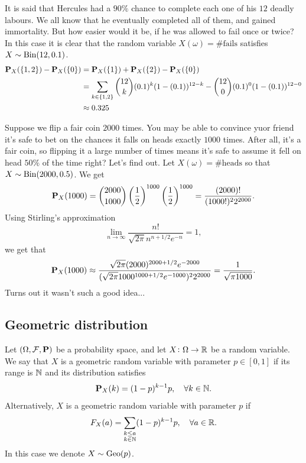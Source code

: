 \documentclass[11pt,a4paper]{article}
\begin{document}
\begin{example}
It is said that Hercules had a $90\%$ chance to complete each
one of his $12$ deadly labours. We all know that he eventually completed
all of them, and gained immortality. But how easier would it be, if he
was allowed to fail once or twice?
In this case it is clear that the random variable $X(\omega) = \#\text{fails}$
satisfies $X \sim \operatorname{Bin}(12,0.1)$.
\begin{align*}
  \mathbf{P}_X(\{1,2\}) - \mathbf{P}_X(\{0\}) &=
  \mathbf{P}_X(\{1\}) + \mathbf{P}_X(\{2\}) - \mathbf{P}_X(\{0\}) \\ &=
  \sum_{k \in \{1,2\}}
  \binom{12}{k} (0.1)^k (1 - (0.1))^{12-k} -
  \binom{12}{0} (0.1)^0 (1 - (0.1))^{12-0} \\ &\approx
  0.325
\end{align*}
\end{example}
\begin{example}
  Suppose we flip a fair coin $2000$ times. You may be able to convince
  yuor friend it's safe to bet on the chances it falls on heads exactly
  $1000$ times. After all, it's a fair coin, so flipping it a large number
  of times means it's safe to assume it fell on head $50\%$ of the time
  right? Let's find out.
  Let $X(\omega) = \#\text{heads}$ so that
  $X \sim \operatorname{Bin}(2000,0.5)$.
  We get
  \[
    \mathbf{P}_{X}(1000) =
    \binom{2000}{1000} \left(\frac{1}{2}\right)^{1000}
    \left(\frac{1}{2}\right)^{1000} =
    \frac{(2000)!}{(1000!)^{2}2^{2000}}.
  \]
  Using Stirling's approximation
  \[
    \lim_{n\rightarrow\infty}
    {\frac{n!}{\sqrt{2\pi}n^{n+1/2}e^{-n}}}=1,
  \]
  we get that
  \[
    \mathbf{P}_{X}(1000) \approx
    \frac{\sqrt{2\pi}(2000)^{2000+1/2}e^{-2000}}
        {({\sqrt{2\pi}}1000^{1000+1/2}e^{-1000})^{2}2^{2000}} =
    {\frac{1}{\sqrt{\pi 1000}}}.
  \]
  Turns out it wasn't such a good idea...
\end{example}

\subsection{Geometric distribution}
\begin{definition}
  Let $(\Omega ,\mathcal F, \mathbf{P})$ be a probability space,
  and let $X \colon \Omega \to \mathbb{R}$ be a random variable.
  We say that $X$ is a geometric random variable with parameter
  $p \in [0,1]$ if its range is $\mathbb{N}$ and its distribution satisfies
  \[
    \mathbf{P}_X(k) = (1-p)^{k-1} p, \quad 
    \forall k \in \mathbb{N}.
  \]
  Alternatively, $X$ is a geometric random variable with parameter
  $p$ if
  \[
    F_X(a) = \sum_{\substack{k \le a \\ k \in \mathbb{N}}}
    (1-p)^{k-1} p, \quad \forall a \in \mathbb{R}.
  \]
  In this case we denote $X \sim \operatorname{Geo}(p)$.
\end{definition}
\end{document}
